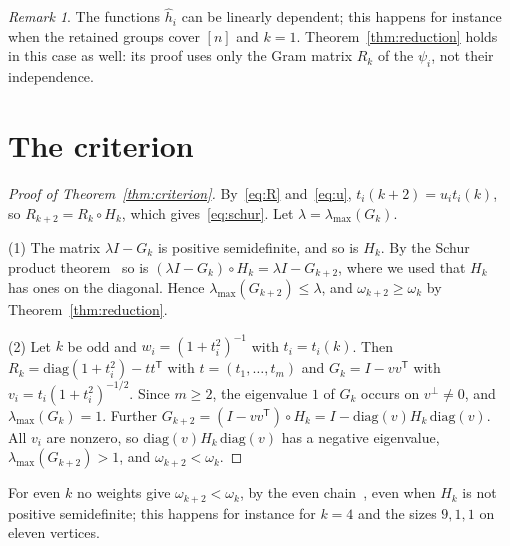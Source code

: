 \documentclass[11pt]{amsart}
\theoremstyle{remark}
\newtheorem{rem}[thm]{Remark}
\numberwithin{equation}{section}
\begin{document}
\begin{rem}
The functions $\hat h_i$ can be linearly dependent; this happens for instance when the retained groups cover $[n]$ and $k=1$. Theorem~\ref{thm:reduction} holds in this case as well: its proof uses only the Gram matrix $R_k$ of the $\psi_i$, not their independence.
\end{rem}

\section{The criterion}\label{sec:criterion}

\begin{proof}[Proof of Theorem~\ref{thm:criterion}]
By~\eqref{eq:R} and~\eqref{eq:u}, $t_i(k+2)=u_it_i(k)$, so $R_{k+2}=R_k\circ H_k$, which gives~\eqref{eq:schur}. Let $\lambda=\lambda_{\max}(G_k)$.

(1) The matrix $\lambda I-G_k$ is positive semidefinite, and so is $H_k$. By the Schur product theorem~\cite[Theorem~7.5.3]{HJ13} so is $(\lambda I-G_k)\circ H_k=\lambda I-G_{k+2}$, where we used that $H_k$ has ones on the diagonal. Hence $\lambda_{\max}(G_{k+2})\le\lambda$, and $\omega_{k+2}\ge\omega_k$ by Theorem~\ref{thm:reduction}.

(2) Let $k$ be odd and $w_i=(1+t_i^2)^{-1}$ with $t_i=t_i(k)$. Then $R_k=\mathrm{diag}(1+t_i^2)-tt^{\mathsf T}$ with $t=(t_1,\dots,t_m)$ and $G_k=I-vv^{\mathsf T}$ with $v_i=t_i(1+t_i^2)^{-1/2}$. Since $m\ge2$, the eigenvalue $1$ of $G_k$ occurs on $v^\perp\ne0$, and $\lambda_{\max}(G_k)=1$. Further $G_{k+2}=(I-vv^{\mathsf T})\circ H_k=I-\mathrm{diag}(v)H_k\,\mathrm{diag}(v)$. All $v_i$ are nonzero, so $\mathrm{diag}(v)H_k\,\mathrm{diag}(v)$ has a negative eigenvalue, $\lambda_{\max}(G_{k+2})>1$, and $\omega_{k+2}<\omega_k$.
\end{proof}

For even $k$ no weights give $\omega_{k+2}<\omega_k$, by the even chain~\cite[Remark~2.10, (2.51)]{CQS26}, even when $H_k$ is not positive semidefinite; this happens for instance for $k=4$ and the sizes $9,1,1$ on eleven vertices.
\end{document}
